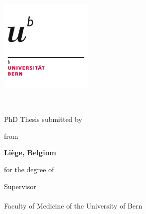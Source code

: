
\begin{titlepage}
	
	\hfill{\includegraphics[width=4.5cm]{pics/Logo-unibe}}
	
	\begin{center}
		
		\vspace*{0.5cm}
		{\Large \facname \\ \textsc{\univname} \par}\vspace{1cm} %
		
		{\huge \bfseries \ttitle\par}\vspace{1cm} %
		
		\large{PhD Thesis submitted by}\vspace{0.5cm}
		
		{\Large \bfseries \authorname \par}\vspace{0.5cm}
		
		
		\large{from }{\Large \bfseries Liège, Belgium \par}\vspace{0.5cm}
		
		\large{for } the degree of \degreename \vspace{0.5cm}
		
		\vfill
		
		\large{Supervisor \\ \supname \\ Faculty of Medicine of the University of Bern}\vspace{0.5cm}
		

\end{center}
\end{titlepage}
